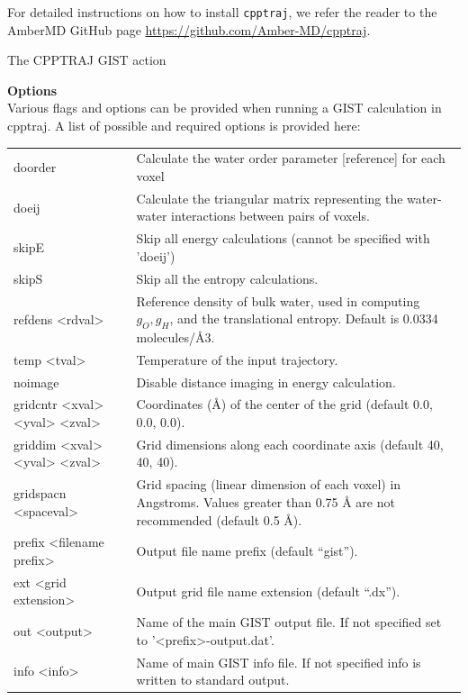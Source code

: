 \documentclass[9pt,tutorial]{livecoms}
\newcommand{\software}{\texttt}
\begin{document}
For detailed instructions on how to install \software{cpptraj}, we refer the reader to the AmberMD GitHub page \url{https://github.com/Amber-MD/cpptraj}.

\begin{Checklists*}

\begin{checklist}{The CPPTRAJ GIST action}\label{cheatsheet}

\textbf{Options}\\
Various flags and options can be provided when running a GIST calculation in 
cpptraj. A list of possible and required options is provided here:

\begin{tabular}{@{}l p{}@{}}
\toprule
doorder & Calculate the water order parameter [reference] for each voxel\\
doeij & Calculate the triangular matrix representing the water-water 
interactions between pairs of voxels.\\
skipE & Skip all energy calculations (cannot be specified with ’doeij’)\\
skipS & Skip all the entropy calculations.\\
refdens <rdval> & Reference density of bulk water, used in computing 
$g_O, g_H$, and the translational entropy. Default is 0.0334 molecules/Å3. \\
temp <tval> & Temperature of the input trajectory. \\
noimage &  Disable distance imaging in energy calculation. \\
gridcntr <xval> <yval> <zval> & Coordinates (Å) of the center of the grid 
(default 0.0, 0.0, 0.0). \\
griddim <xval> <yval> <zval> & Grid dimensions along each coordinate axis 
(default 40, 40, 40).\\
gridspacn <spaceval> & Grid spacing (linear dimension of each voxel) in 
Angstroms. Values greater than 0.75 Å are not recommended (default 0.5 Å).\\
prefix <filename prefix> & Output file name prefix (default “gist”).\\
ext <grid extension> & Output grid file name extension (default “.dx”). \\
out <output> & Name of the main GIST output file. If not specified set to 
’<prefix>-output.dat’.\\
info <info> & Name of main GIST info file. If not specified info is 
written to standard output. \\
\bottomrule
\end{tabular}



\end{checklist}
\end{Checklists*}
\end{document}
